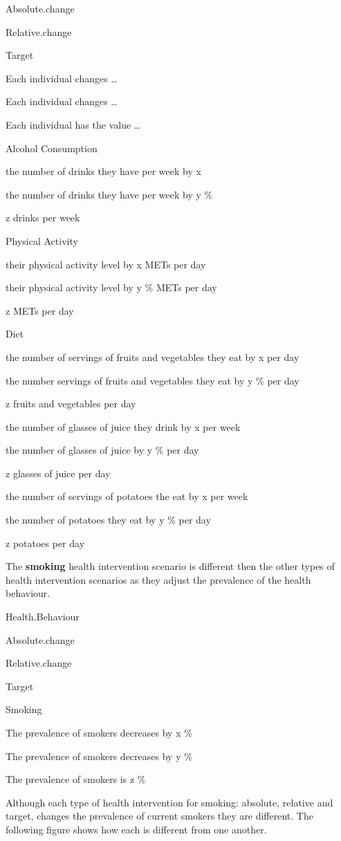 \documentclass[]{book}
\begin{document}
Absolute.change

Relative.change

Target

Each individual changes \ldots{}

Each individual changes \ldots{}

Each individual has the value \ldots{}

Alcohol Consumption

the number of drinks they have per week by x

the number of drinks they have per week by y \%

z drinks per week

Physical Activity

their physical activity level by x METs per day

their physical activity level by y \% METs per day

z METs per day

Diet

the number of servings of fruits and vegetables they eat by x per day

the number servings of fruits and vegetables they eat by y \% per day

z fruits and vegetables per day

the number of glasses of juice they drink by x per week

the number of glasses of juice by y \% per day

z glasses of juice per day

the number of servings of potatoes the eat by x per week

the number of potatoes they eat by y \% per day

z potatoes per day

The \textbf{smoking} health intervention scenario is different then the other types of health intervention scenarios as they adjust the prevalence of the health behaviour.

Health.Behaviour

Absolute.change

Relative.change

Target

Smoking

The prevalence of smokers decreases by x \%

The prevalence of smokers decreases by y \%

The prevalence of smokers is z \%

Although each type of health intervention for smoking: absolute, relative and target, changes the prevalence of current smokers they are different. The following figure shows how each is different from one another.
\end{document}

